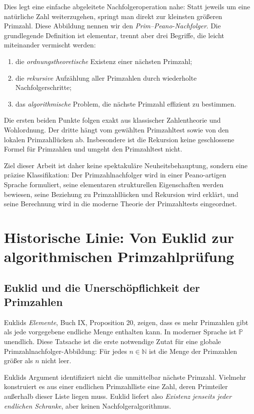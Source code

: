 \documentclass[11pt]{article}
\theoremstyle{definition}
\newcommand{\N}{\mathbb{N}}
\newcommand{\Pp}{\mathbb{P}}
\begin{document}
Dies legt eine einfache abgeleitete Nachfolgeroperation nahe: Statt jeweils um eine natürliche Zahl weiterzugehen, springt man direkt zur kleinsten größeren Primzahl. Diese Abbildung nennen wir den \emph{Prim--Peano-Nachfolger}. Die grundlegende Definition ist elementar, trennt aber drei Begriffe, die leicht miteinander vermischt werden:
\begin{enumerate}[label=(\roman*)]
\item die \emph{ordnungstheoretische} Existenz einer nächsten Primzahl;
\item die \emph{rekursive} Aufzählung aller Primzahlen durch wiederholte Nachfolgerschritte;
\item das \emph{algorithmische} Problem, die nächste Primzahl effizient zu bestimmen.
\end{enumerate}

Die ersten beiden Punkte folgen exakt aus klassischer Zahlentheorie und Wohlordnung. Der dritte hängt vom gewählten Primzahltest sowie von den lokalen Primzahllücken ab. Insbesondere ist die Rekursion keine geschlossene Formel für Primzahlen und umgeht den Primzahltest nicht.

Ziel dieser Arbeit ist daher keine spektakuläre Neuheitsbehauptung, sondern eine präzise Klassifikation: Der Primzahlnachfolger wird in einer Peano-artigen Sprache formuliert, seine elementaren strukturellen Eigenschaften werden bewiesen, seine Beziehung zu Primzahllücken und Rekursion wird erklärt, und seine Berechnung wird in die moderne Theorie der Primzahltests eingeordnet.

\section{Historische Linie: Von Euklid zur algorithmischen Primzahlprüfung}

\subsection{Euklid und die Unerschöpflichkeit der Primzahlen}

Euklids \emph{Elemente}, Buch IX, Proposition 20, zeigen, dass es mehr Primzahlen gibt als jede vorgegebene endliche Menge enthalten kann. In moderner Sprache ist $\Pp$ unendlich. Diese Tatsache ist die erste notwendige Zutat für eine globale Primzahlnachfolger-Abbildung: Für jedes $n\in\N$ ist die Menge der Primzahlen größer als $n$ nicht leer.

Euklids Argument identifiziert nicht die unmittelbar nächste Primzahl. Vielmehr konstruiert es aus einer endlichen Primzahlliste eine Zahl, deren Primteiler außerhalb dieser Liste liegen muss. Euklid liefert also \emph{Existenz jenseits jeder endlichen Schranke}, aber keinen Nachfolgeralgorithmus.
\end{document}
